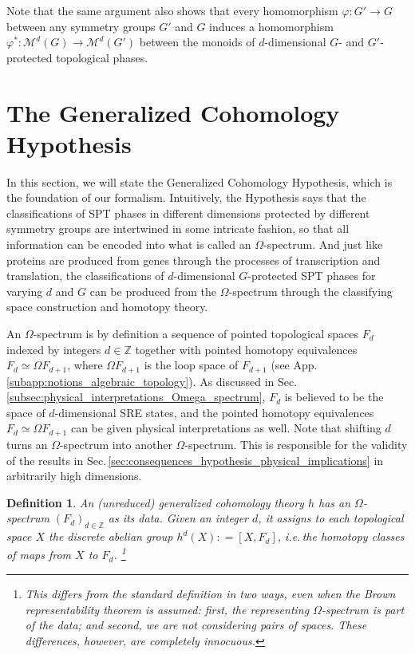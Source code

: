 \documentclass[sort&compress]{elsarticle}
\theoremstyle{theoremstyle}
\theoremstyle{framedtheoremstyle}
\theoremstyle{definitionstyle}
\newtheorem{dfn}[nul]{Definition}%
\theoremstyle{definitionstyle}
\theoremstyle{definitionstyle}
\theoremstyle{definitionstyle}
\theoremstyle{nameddefinitionstyle}
\theoremstyle{framednameddefinitionstyle}
\theoremstyle{proofstyle}
\theoremstyle{definitionstyle}
\newcommand{\fromto}{\rightarrow}
\newcommand{\ZZZ}{\mathbb{Z}}
\newcommand{\M}{\mathcal{M}}
\newcommand{\coloneq}{\mathrel{\mathop:}=}
\newcommand{\homotopic}{\simeq}
\newcommand{\paren}[1]{\left( #1 \right)}
\newcommand{\brackets}[1]{\left[ #1 \right]}
\begin{document}
Note that the same argument also shows that every homomorphism $\varphi: G' \fromto G$ between any symmetry groups $G'$ and $G$ induces a homomorphism $\varphi^\ast: \M^d(G) \fromto \M^d(G')$ between the monoids of $d$-dimensional $G$- and $G'$-protected topological phases.











\section{The Generalized Cohomology Hypothesis\label{sec:generalized_cohomology_hypothesis}}

In this section, we will state the Generalized Cohomology Hypothesis, which is the foundation of our formalism.
Intuitively, the Hypothesis says that the classifications of SPT phases in different dimensions protected by different symmetry groups are intertwined in some intricate fashion, so that all information can be encoded into what is called an $\Omega$-spectrum. And just like proteins are produced from genes through the processes of transcription and translation, the classifications of $d$-dimensional $G$-protected SPT phases for varying $d$ and $G$ can be produced from the $\Omega$-spectrum through the classifying space construction and homotopy theory.

An $\Omega$-spectrum is by definition a sequence of pointed topological spaces $F_d$ indexed by integers $d\in \ZZZ$ together with pointed homotopy equivalences $F_d \homotopic \Omega F_{d+1}$, where $\Omega F_{d+1}$ is the loop space of $F_{d+1}$ (see App.\,\ref{subapp:notions_algebraic_topology}). As discussed in Sec.\,\ref{subsec:physical_interpretations_Omega_spectrum}, $F_d$ is believed to be the space of $d$-dimensional SRE states, and the pointed homotopy equivalences $F_d \homotopic \Omega F_{d+1}$ can be given physical interpretations as well.
Note that shifting $d$ turns an $\Omega$-spectrum into another $\Omega$-spectrum. This is responsible for the validity of the results in Sec.\,\ref{sec:consequences_hypothesis_physical_implications} in arbitrarily high dimensions.

\begin{dfn}
An (unreduced) generalized cohomology theory $h$ has an $\Omega$-spectrum $\paren{F_d}_{d\in \ZZZ}$ as its data. Given an integer $d$, it assigns to each topological space $X$ the discrete abelian group $h^d(X) \coloneq \brackets{X, F_d}$, i.e.\,the homotopy classes of maps from $X$ to $F_d$.%
\footnote{This differs from the standard definition in two ways, even when the Brown representability theorem is assumed: first, the representing $\Omega$-spectrum is part of the data; and second, we are not considering pairs of spaces. These differences, however, are completely innocuous.}
\label{dfn:unreduced_generalized_cohomology_theory}
\end{dfn}
\end{document}
